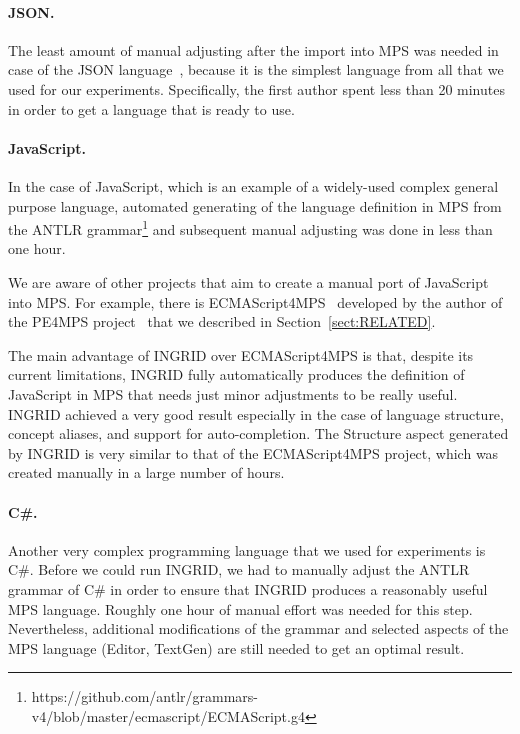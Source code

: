 \paragraph{JSON.}
The least amount of manual adjusting after the import into MPS was needed in case of the JSON language~\cite{ref:JSON}, because it is the simplest language from all that we used for our experiments.
Specifically, the first author spent less than 20 minutes in order to get a language that is ready to use.

\paragraph{JavaScript.}
In the case of JavaScript, which is an example of a widely-used complex general purpose language, automated generating of the language definition in MPS from the ANTLR grammar\footnote{https://github.com/antlr/grammars-v4/blob/master/ecmascript/ECMAScript.g4} and subsequent manual adjusting was done in less than one hour.

We are aware of other projects that aim to create a manual port of JavaScript into MPS.
For example, there is ECMAScript4MPS~\cite{ref:ECMA4MPS} developed by the author of the PE4MPS project~\cite{ref:PE4MPS} that we described in Section~\ref{sect:RELATED}.

The main advantage of INGRID over ECMAScript4MPS is that, despite its current limitations, INGRID fully automatically produces the definition of JavaScript in MPS that needs just minor adjustments to be really useful.
INGRID achieved a very good result especially in the case of language structure, concept aliases, and support for auto-completion.
The Structure aspect generated by INGRID is very similar to that of the ECMAScript4MPS project, which was created manually  in a large number of hours.

\paragraph{C\#.}
Another very complex programming language that we used for experiments is C\#.
Before we could run INGRID, we had to manually adjust the ANTLR grammar of C\# in order to ensure that INGRID produces a reasonably useful MPS language.
Roughly one hour of manual effort was needed for this step.
Nevertheless, additional modifications of the grammar and selected aspects of the MPS language (Editor, TextGen) are still needed to get an optimal result.

